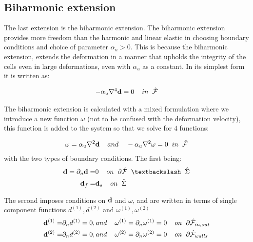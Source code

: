 \subsection{Biharmonic extension} 
The last extension is the biharmonic extension. The biharmonic extension provides more freedom than the harmonic and linear elastic in choosing boundary conditions and choice of parameter $\alpha_u > 0$. This is because the biharmonic extension, extends the deformation in a manner that upholds the integrity of the cells even in large deformations, even with $\alpha_u$ as a constant. In its simplest form it is written as:

\begin{equation}
- \alpha_u \nabla^4 \bold{d} = 0 \hspace{4mm}  in \hspace{2mm} \hat{\mathcal{F}}\\
\end{equation}

The biharmonic extension is calculated with a mixed formulation where we introduce a new function $\omega$ (not to be confused with the deformation velocity), this function is added to the system so that we solve for 4 functions:

\begin{equation}
\omega = \alpha_u \nabla^2 \bold{d} \hspace{4mm} and \hspace{4mm} - \alpha_u \nabla^2 \omega = 0 \hspace{2mm}   in \hspace{2mm} \hat{\mathcal{F}}
\end{equation}
with the two types of boundary conditions. The first being:
\begin{align}
\bold{d} = \partial_n \bold{d} =& 0 \hspace{4mm} on \hspace{2mm} \partial \hat{\mathcal{F}} \hspace{2mm} \textbackslash \hspace{2mm} \hat{\Sigma}\\
\bold{d}_f =& \bold{d}_s \hspace{4mm } on \hspace{2mm } \hat{\Sigma} 
\end{align}

The second imposes conditions on $\bold{d}$ and $\omega$, and are written in terms of single component functions $d^{(1)},d^{(2)}$ and $\omega^{(1)}, \omega^{(2)}$	
\begin{align}
\bold{d}^{(1)} =& \partial_n d^{(1)} = 0 , and \hspace{4mm}   \omega^{(1)} = \partial_n \omega^{(1)} = 0    \hspace{4mm} on \hspace{2mm} \partial \hat{\mathcal{F}}_{in,out} \\
\bold{d}^{(2)} =& \partial_n d^{(2)} = 0 , and \hspace{4mm}   \omega^{(2)} = \partial_n \omega^{(2)} = 0    \hspace{4mm} on \hspace{2mm} \partial \hat{\mathcal{F}}_{walls} \\
\end{align}


